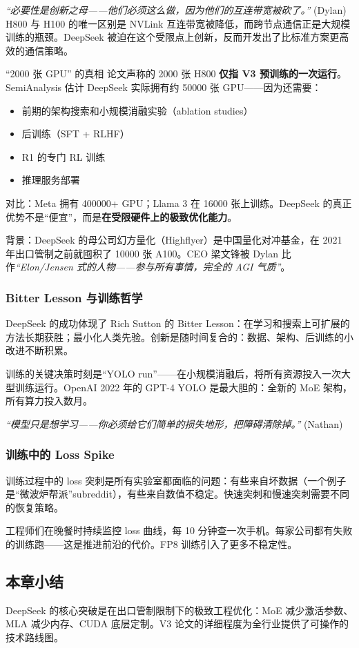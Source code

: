 \textit{``必要性是创新之母——他们必须这么做，因为他们的互连带宽被砍了。''} (Dylan) H800 与 H100 的唯一区别是 NVLink 互连带宽被降低，而跨节点通信正是大规模训练的瓶颈。DeepSeek 被迫在这个受限点上创新，反而开发出了比标准方案更高效的通信策略。

\begin{warningbox}{``2000 张 GPU'' 的真相}
论文声称的 2000 张 H800 \textbf{仅指 V3 预训练的一次运行}。SemiAnalysis 估计 DeepSeek 实际拥有约 50000 张 GPU——因为还需要：
\begin{itemize}
    \item 前期的架构搜索和小规模消融实验（ablation studies）
    \item 后训练（SFT + RLHF）
    \item R1 的专门 RL 训练
    \item 推理服务部署
\end{itemize}

对比：Meta 拥有 400000+ GPU；Llama 3 在 16000 张上训练。DeepSeek 的真正优势不是``便宜''，而是\textbf{在受限硬件上的极致优化能力}。

背景：DeepSeek 的母公司幻方量化（Highflyer）是中国量化对冲基金，在 2021 年出口管制之前就囤积了 10000 张 A100。CEO 梁文锋被 Dylan 比作\textit{``Elon/Jensen 式的人物——参与所有事情，完全的 AGI 气质''}。
\end{warningbox}

\subsubsection{Bitter Lesson 与训练哲学}

DeepSeek 的成功体现了 Rich Sutton 的 Bitter Lesson：在学习和搜索上可扩展的方法长期获胜；最小化人类先验。创新是随时间复合的：数据、架构、后训练的小改进不断积累。

训练的关键决策时刻是``YOLO run''——在小规模消融后，将所有资源投入一次大型训练运行。OpenAI 2022 年的 GPT-4 YOLO 是最大胆的：全新的 MoE 架构，所有算力投入数月。

\textit{``模型只是想学习——你必须给它们简单的损失地形，把障碍清除掉。''} (Nathan)

\subsubsection{训练中的 Loss Spike}

训练过程中的 loss 突刺是所有实验室都面临的问题：有些来自坏数据（一个例子是``微波炉帮派''subreddit），有些来自数值不稳定。快速突刺和慢速突刺需要不同的恢复策略。

工程师们在晚餐时持续监控 loss 曲线，每 10 分钟查一次手机。每家公司都有失败的训练跑——这是推进前沿的代价。FP8 训练引入了更多不稳定性。

\subsection{本章小结}

DeepSeek 的核心突破是在出口管制限制下的极致工程优化：MoE 减少激活参数、MLA 减少内存、CUDA 底层定制。V3 论文的详细程度为全行业提供了可操作的技术路线图。

